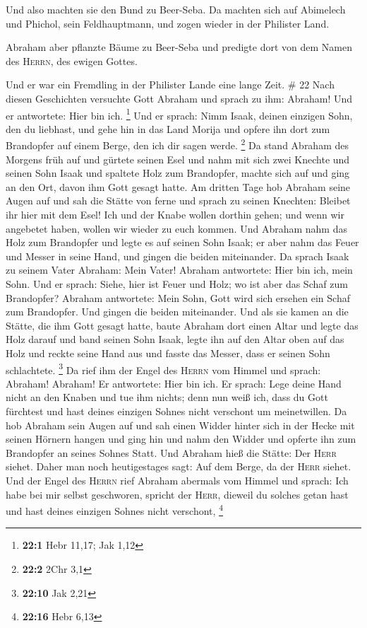  Und also machten sie den Bund zu Beer-Seba. Da machten
sich auf Abimelech und Phichol, sein Feldhauptmann, und zogen wieder in
der Philister Land.

 Abraham aber pflanzte Bäume zu Beer-Seba und predigte
dort von dem Namen des \textsc{Herrn}, des ewigen Gottes.

 Und er war ein Fremdling in der Philister Lande eine
lange Zeit. \# 22  Nach diesen Geschichten versuchte Gott
Abraham und sprach zu ihm: Abraham! Und er antwortete: Hier bin ich.
\footnote{\textbf{22:1} Hebr 11,17; Jak 1,12}  Und er
sprach: Nimm Isaak, deinen einzigen Sohn, den du liebhast, und gehe hin
in das Land Morija und opfere ihn dort zum Brandopfer auf einem Berge,
den ich dir sagen werde. \footnote{\textbf{22:2} 2Chr 3,1}
 Da stand Abraham des Morgens früh auf und gürtete seinen
Esel und nahm mit sich zwei Knechte und seinen Sohn Isaak und spaltete
Holz zum Brandopfer, machte sich auf und ging an den Ort, davon ihm Gott
gesagt hatte.  Am dritten Tage hob Abraham seine Augen auf
und sah die Stätte von ferne  und sprach zu seinen
Knechten: Bleibet ihr hier mit dem Esel! Ich und der Knabe wollen
dorthin gehen; und wenn wir angebetet haben, wollen wir wieder zu euch
kommen.  Und Abraham nahm das Holz zum Brandopfer und
legte es auf seinen Sohn Isaak; er aber nahm das Feuer und Messer in
seine Hand, und gingen die beiden miteinander.  Da sprach
Isaak zu seinem Vater Abraham: Mein Vater! Abraham antwortete: Hier bin
ich, mein Sohn. Und er sprach: Siehe, hier ist Feuer und Holz; wo ist
aber das Schaf zum Brandopfer?  Abraham antwortete: Mein
Sohn, Gott wird sich ersehen ein Schaf zum Brandopfer. Und gingen die
beiden miteinander.  Und als sie kamen an die Stätte, die
ihm Gott gesagt hatte, baute Abraham dort einen Altar und legte das Holz
darauf und band seinen Sohn Isaak, legte ihn auf den Altar oben auf das
Holz  und reckte seine Hand aus und fasste das Messer,
dass er seinen Sohn schlachtete. \footnote{\textbf{22:10} Jak 2,21}
 Da rief ihm der Engel des \textsc{Herrn} vom Himmel und
sprach: Abraham! Abraham! Er antwortete: Hier bin ich. 
Er sprach: Lege deine Hand nicht an den Knaben und tue ihm nichts; denn
nun weiß ich, dass du Gott fürchtest und hast deines einzigen Sohnes
nicht verschont um meinetwillen.  Da hob Abraham sein
Augen auf und sah einen Widder hinter sich in der Hecke mit seinen
Hörnern hangen und ging hin und nahm den Widder und opferte ihn zum
Brandopfer an seines Sohnes Statt.  Und Abraham hieß die
Stätte: Der \textsc{Herr} siehet. Daher man noch heutigestages sagt: Auf
dem Berge, da der \textsc{Herr} siehet.  Und der Engel
des \textsc{Herrn} rief Abraham abermals vom Himmel  und
sprach: Ich habe bei mir selbst geschworen, spricht der \textsc{Herr},
dieweil du solches getan hast und hast deines einzigen Sohnes nicht
verschont, \footnote{\textbf{22:16} Hebr 6,13}

